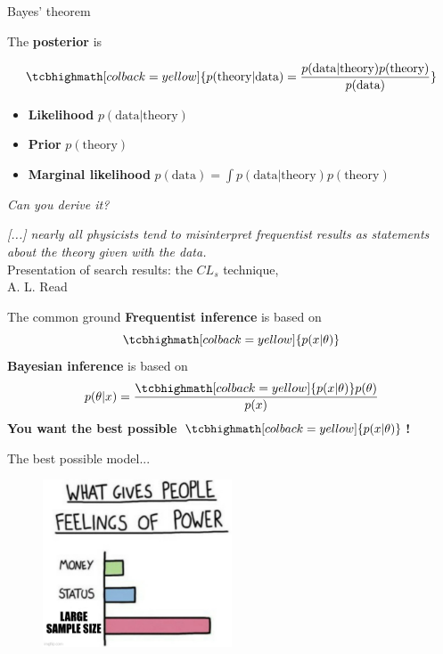 \documentclass[
aspectratio=169,
14pt,
professionalfonts
]{beamer}
\begin{document}
\begin{frame}{Bayes' theorem}

The \textbf{posterior} is

$$
\tcbhighmath[colback=yellow]{
p(\text{theory} | \text{data}) = \frac{p(\text{data}|\text{theory}) p(\text{theory})}{p(\text{data})}
}
$$

\begin{itemize}
    \item \textbf{Likelihood} $p(\text{data}|\text{theory})$
    \item \textbf{Prior} $p(\text{theory})$
    \item \textbf{Marginal likelihood} ${p(\text{data}) = \int p(\text{data}|\text{theory}) p(\text{theory})}$
\end{itemize}
\begin{flushright}
    \textit{Can you derive it?}
\end{flushright}
\end{frame}

\begin{frame}
    \textit{ [...] nearly all physicists tend to misinterpret frequentist results as statements about the theory given with the data.}\\
    \flushright Presentation of search results: the $CL_s$ technique,\\ A. L. Read
\end{frame}

\begin{frame}{The common ground}
    \textbf{Frequentist inference} is based on 
    $$\tcbhighmath[colback=yellow]{p(x|\theta)}$$
    \textbf{Bayesian inference} is based on
    $$p(\theta | x) = \frac{\tcbhighmath[colback=yellow]{p(x|\theta)} p(\theta)}{p(x)}$$
    \centering
    \Large
    \textbf{You want the best possible $\tcbhighmath[colback=yellow]{p(x|\theta)}$!}
\end{frame}

\begin{frame}[noframenumbering]{The best possible model...}
    \begin{figure}
        \includegraphics[width=0.5\textwidth]{../plots/sample_size.jpg}
    \end{figure}
\end{frame}
\end{document}

